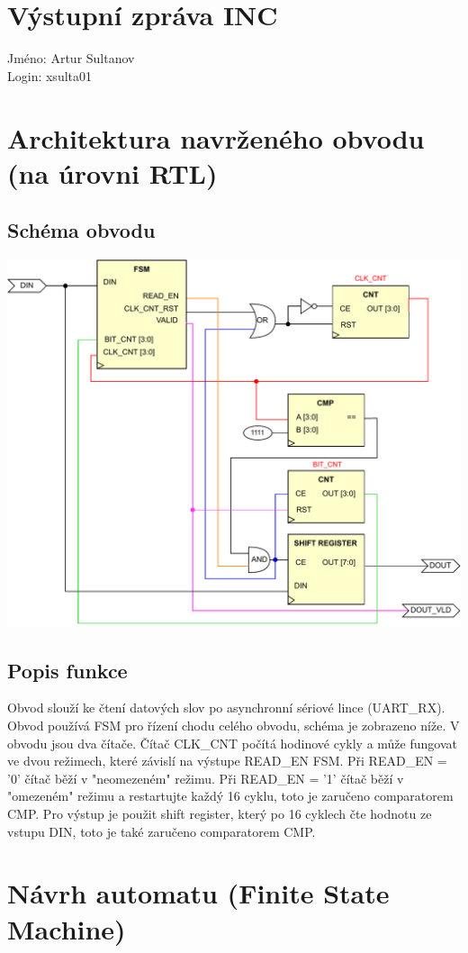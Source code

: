 \documentclass[a4paper, 11pt]{article}
\begin{document}
\section*{\huge{Výstupní zpráva INC}}
Jméno: Artur Sultanov \\
Login: xsulta01
\section{Architektura navrženého obvodu (na úrovni RTL)}
\subsection{Schéma obvodu}
\includegraphics[width=\textwidth,height=\textheight,keepaspectratio]{INC_RTL.pdf}
\subsection{Popis funkce}
Obvod slouží ke čtení datových slov po asynchronní sériové lince (UART\_RX). Obvod používá FSM pro řízení chodu celého obvodu, schéma je zobrazeno níže.
V obvodu jsou dva čítače. Čítač CLK\_CNT počítá hodinové cykly a může fungovat ve dvou režimech, které závislí na výstupe READ\_EN FSM. Při READ\_EN = '0' čítač běží v "neomezeném" režimu. Při READ\_EN = '1' čítač běží v "omezeném" režimu a restartujte každý 16 cyklu, toto je zaručeno comparatorem CMP. Pro výstup je použit shift register, který po 16 cyklech čte hodnotu ze vstupu DIN, toto je také zaručeno comparatorem CMP.

\newpage
\section{Návrh automatu (Finite State Machine)}
\end{document}

